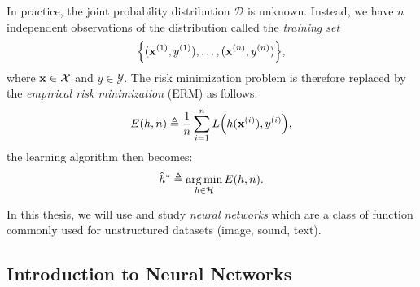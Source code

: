 In practice, the joint probability distribution $\mathcal{D}$ is unknown.
Instead, we have $n$ independent observations of the distribution called the \emph{training set}
\begin{equation}
  \left\{ (\xvec^{(1)}, y^{(1)} ), \dots, ( \xvec^{(n)}, y^{(n)} ) \right\} ,
\end{equation}
where $\mathbf{x} \in \mathcal{X}$ and $y \in \mathcal{Y}$.
The risk minimization problem is therefore replaced by the \emph{empirical risk minimization} (ERM) as follows:
\begin{equation}
  E(h, n) \triangleq \frac{1}{n} \sum_{i = 1}^{n} L\left(h(\xvec^{(i)}), y^{(i)}\right) ,
\end{equation}
the learning algorithm then becomes:
\begin{equation}
  \hat{h}^* \triangleq \operatorname*{arg\,min}_{h \in \mathcal{H}} E(h, n)  .
\end{equation}

In this thesis, we will use and study \emph{neural networks} which are a class of function commonly used for unstructured datasets (image, sound, text).


\subsection{Introduction to Neural Networks}
\label{subsection:ch1-introduction_to_neural_networks}

